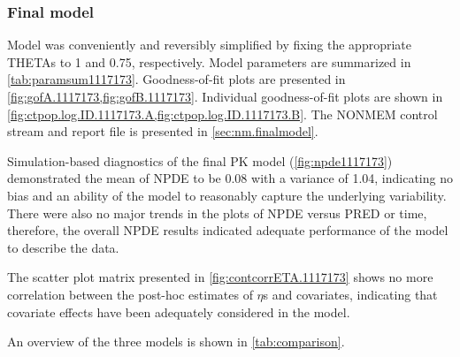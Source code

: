 \clearpage


\subsubsection{Final model}

Model   was conveniently and reversibly simplified by fixing the appropriate THETAs to 1 and 0.75, respectively. Model parameters are summarized in \cref{tab:paramsum1117173}. Goodness-of-fit plots are presented in \cref{fig:gofA.1117173,fig:gofB.1117173}. Individual goodness-of-fit plots are shown in \cref{fig:ctpop.log.ID.1117173.A,fig:ctpop.log.ID.1117173.B}. The NONMEM control stream and report file is presented in \cref{sec:nm.finalmodel}. 





Simulation-based diagnostics of the final PK model  (\cref{fig:npde1117173}) demonstrated the mean of \gls{NPDE} to be 0.08 with a variance of 1.04, indicating no bias and an ability of the model to reasonably capture the underlying variability. There were also no major trends in the plots of NPDE versus \gls{PRED} or time, therefore, the overall NPDE results indicated adequate performance of the model to describe the data.


The scatter plot matrix presented in \cref{fig:contcorrETA.1117173} shows no more correlation between the post-hoc estimates of $\eta$s and covariates, indicating that covariate effects have been adequately considered in the model.

An overview of the three models is shown in \cref{tab:comparison}. 

